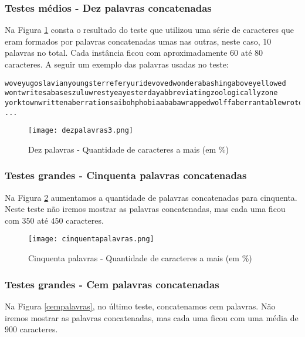\documentclass[12pt]{article}
\begin{document}
\subsubsection{Testes médios - Dez palavras concatenadas}
\label{medio10}

Na Figura \ref{dezpalavras} consta o resultado do teste que utilizou uma série de caracteres que eram formados por palavras concatenadas umas nas outras, neste caso, 10 palavras no total. Cada instância ficou com aproximadamente $60$ até $80$ caracteres. A seguir um exemplo das palavras usadas no teste:

\begin{verbatim}
woveyugoslavianyoungsterreferyuridevovedwonderabashingaboveyellowed
wontwritesabaseszuluwrestyeayesterdayabbreviatingzoologicallyzone
yorktownwrittenaberrationsaibohphobiaababawrappedwolffaberrantablewrote
...
\end{verbatim}


    \begin{figure}[h!]
        \centering
        \texttt{[image: dezpalavras3.png]}
        \caption{Dez palavras - Quantidade de caracteres a mais (em \%)}
        \label{dezpalavras}
    \end{figure}


\subsubsection{Testes grandes - Cinquenta palavras concatenadas}
\label{grande50}

Na Figura \ref{cinquentapalavras} aumentamos a quantidade de palavras concatenadas para cinquenta. Neste teste não iremos mostrar as palavras concatenadas, mas cada uma ficou com $350$ até $450$ caracteres.

    \begin{figure}[h!]
        \centering
        \texttt{[image: cinquentapalavras.png]}
        \caption{Cinquenta palavras - Quantidade de caracteres a mais (em \%)}
        \label{cinquentapalavras}
    \end{figure}

\subsubsection{Testes grandes - Cem palavras concatenadas}
\label{grande100}

Na Figura \ref{cempalavras}, no último teste, concatenamos cem palavras. Não iremos mostrar as palavras concatenadas, mas cada uma ficou com uma média de $900$ caracteres.
\end{document}
